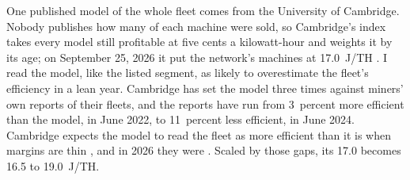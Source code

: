 One published model of the whole fleet comes from the University of Cambridge. Nobody publishes how many of each machine were sold, so Cambridge's index takes every model still profitable at five cents a kilowatt-hour and weights it by its age; on September 25, 2026 it put the network's machines at 17.0~J/TH \autocite{CBECI2026}. %
I read the model, like the listed segment, as likely to overestimate the fleet's efficiency in a lean year. Cambridge has set the model three times against miners' own reports of their fleets, and the reports have run from 3~percent more efficient than the model, in June 2022, to 11~percent less efficient, in June 2024. Cambridge expects the model to read the fleet as more efficient than it is when margins are thin \autocite{CCAF2025}, and in 2026 they were \autocite{CoinSharesMiningQ22026}. Scaled by those gaps, its 17.0 becomes 16.5 to 19.0~J/TH. %

